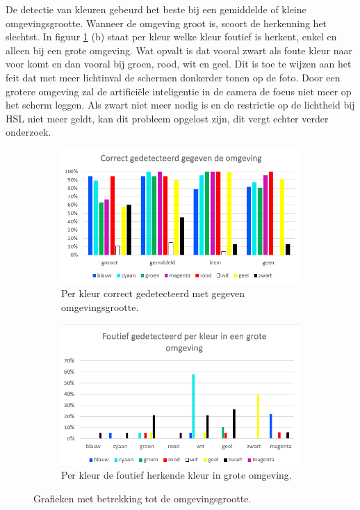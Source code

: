 De detectie van kleuren gebeurd het beste bij een gemiddelde of kleine omgevingsgrootte. Wanneer de omgeving groot is, scoort de herkenning het slechtst. In figuur \ref{fig:omgeving} (b) staat per kleur welke kleur foutief is herkent, enkel en alleen bij een grote omgeving. Wat opvalt is dat vooral zwart als foute kleur naar voor komt en dan vooral bij groen, rood, wit en geel. Dit is toe te wijzen aan het feit dat met meer lichtinval de schermen donkerder tonen op de foto. Door een grotere omgeving zal de artificiële inteligentie in de camera de focus niet meer op het scherm leggen. Als zwart niet meer nodig is en de restrictie op de lichtheid bij HSL niet meer geldt, kan dit probleem opgelost zijn, dit vergt echter verder onderzoek.
\begin{figure}
	\begin{subfigure}{0.5\textwidth}
	\centering
	\includegraphics{img/Environment}
	\caption{Per kleur correct gedetecteerd met gegeven omgevingsgrootte.}
	\end{subfigure}
	
	\begin{subfigure}{0.5\textwidth}
	\centering
	\includegraphics{img/BigEnvPerColor}
	\caption{Per kleur de foutief herkende kleur in grote omgeving.}
	\end{subfigure}
	\caption{Grafieken met betrekking tot de omgevingsgrootte.}
	\label{fig:omgeving}
\end{figure}

